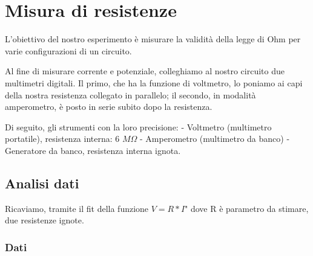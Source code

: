 \chapter{Misura di resistenze}

L'obiettivo del nostro esperimento è misurare la validità della legge di Ohm per varie configurazioni di un circuito. 

Al fine di misurare corrente e potenziale, colleghiamo al nostro circuito due multimetri digitali. Il primo, che ha la funzione di voltmetro, lo poniamo ai capi della nostra resistenza collegato in parallelo; il secondo, in modalità amperometro, è posto in serie subito dopo la resistenza. 

Di seguito, gli strumenti con la loro precisione:
- Voltmetro (multimetro portatile), resistenza interna: 6 $M\Omega$
- Amperometro (multimetro da banco)
- Generatore da banco, resistenza interna ignota.


\section{Analisi dati}

Ricaviamo, tramite  il fit della funzione $V=R*I$" dove R è parametro da stimare, due resistenze ignote.

\subsection{Dati}

